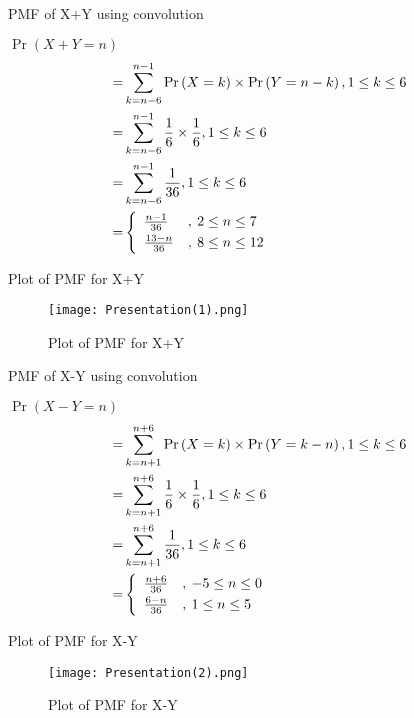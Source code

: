 \documentclass{beamer}
\providecommand{\brak}[1]{\ensuremath{\left(#1\right)}}
\begin{document}
\begin{frame}{PMF of X+Y using convolution}
    \begin{block}{}
        $\Pr\brak{X+Y=n}$
        \begin{align}
            =&\sum_{k=n-6}^{n-1} \Pr\brak{X=k}\times\Pr\brak{Y=n-k}, 1\leq k \leq 6\\
            =&\sum_{k=n-6}^{n-1} \frac{1}{6}\times\frac{1}{6}, 1\leq k \leq 6\\
            =&\sum_{k=n-6}^{n-1} \frac{1}{36}, 1\leq k \leq 6\\
            =&
            \left\{
	        \begin{array}{ll}
		        \frac{n-1}{36}  & ,\: 2 \leq n \leq 7 \smallskip\\
		        \frac{13-n}{36} & ,\: 8 \leq n \leq 12
	        \end{array}
            \right.\label{0.0.9}
        \end{align}
    \end{block}
\end{frame}
\begin{frame}{Plot of PMF for X+Y}
    \begin{figure}[htb]
        \texttt{[image: Presentation(1).png]}
        \caption{Plot of PMF for X+Y}
    \end{figure}
\end{frame}
\begin{frame}{PMF of X-Y using convolution}
    \begin{block}{}
        $\Pr\brak{X-Y=n}$
        \begin{align}
            =&\sum_{k=n+1}^{n+6} \Pr\brak{X=k}\times\Pr\brak{Y=k-n}, 1\leq k \leq 6\\
            =&\sum_{k=n+1}^{n+6} \frac{1}{6}\times\frac{1}{6}, 1\leq k \leq 6\\
            =&\sum_{k=n+1}^{n+6} \frac{1}{36}, 1\leq k \leq 6\\
            =&
            \left\{
	        \begin{array}{ll}
		        \frac{n+6}{36} & ,\: -5 \leq n \leq 0 \smallskip\\
		        \frac{6-n}{36} & ,\: 1  \leq n \leq 5
	        \end{array}
            \right.\label{0.0.13}
        \end{align}
    \end{block}
\end{frame}
\begin{frame}{Plot of PMF for X-Y }
    \begin{figure}[htb]
        \texttt{[image: Presentation(2).png]}
        \caption{Plot of PMF for X-Y}
    \end{figure}
\end{frame}
\end{document}
